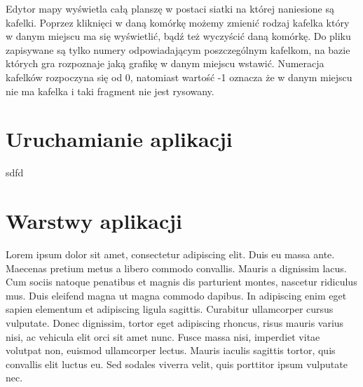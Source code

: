 Edytor mapy wyświetla całą planszę w postaci siatki na której naniesione są kafelki. Poprzez kliknięci w daną komórkę możemy zmienić rodzaj kafelka który w danym miejscu ma się wyświetlić, bądź też wyczyścić daną komórkę. Do pliku zapisywane są tylko numery odpowiadającym poszczególnym kafelkom, na bazie których gra rozpoznaje jaką grafikę w danym miejscu wstawić. Numeracja kafelków rozpoczyna się od 0, natomiast wartość -1 oznacza że w danym miejscu nie ma kafelka i taki fragment nie jest rysowany.

\section{Uruchamianie aplikacji}
sdfd



\section{Warstwy aplikacji}

Lorem ipsum dolor sit amet, consectetur adipiscing elit. Duis eu massa ante. Maecenas pretium metus a libero commodo convallis. Mauris a dignissim lacus. Cum sociis natoque penatibus et magnis dis parturient montes, nascetur ridiculus mus. Duis eleifend magna ut magna commodo dapibus. In adipiscing enim eget sapien elementum et adipiscing ligula sagittis. Curabitur ullamcorper cursus vulputate. Donec dignissim, tortor eget adipiscing rhoncus, risus mauris varius nisi, ac vehicula elit orci sit amet nunc. Fusce massa nisi, imperdiet vitae volutpat non, euismod ullamcorper lectus. Mauris iaculis sagittis tortor, quis convallis elit luctus eu. Sed sodales viverra velit, quis porttitor ipsum vulputate nec.








